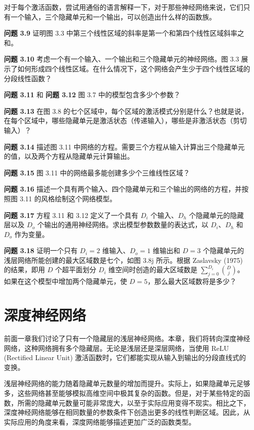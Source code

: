 \documentclass[lang=cn,newtx,10pt,scheme=chinese]{elegantbook}
\begin{document}
对于每个激活函数，尝试用通俗的语言解释一下，对于那些神经网络来说，它们只有一个输入，三个隐藏单元和一个输出，可以创造出什么样的函数族。


\textbf{问题 3.9} 证明图 3.3 中第三个线性区域的斜率是第一个和第四个线性区域斜率之和。

\textbf{问题 3.10} 考虑一个有一个输入、一个输出和三个隐藏单元的神经网络。图 3.3 展示了如何形成四个线性区域。在什么情况下，这个网络会产生少于四个线性区域的分段线性函数？

\textbf{问题 3.11} 和 \textbf{问题 3.12} 图 3.7 中的模型包含多少个参数？

\textbf{问题 3.13} 在图 3.8 的七个区域中，每个区域的激活模式分别是什么？也就是说，在每个区域中，哪些隐藏单元是激活状态（传递输入），哪些是非激活状态（剪切输入）？

\textbf{问题 3.14} 描述图 3.11 中网络的方程。需要三个方程从输入计算出三个隐藏单元的值，以及两个方程从隐藏单元计算输出。

\textbf{问题 3.15} 图 3.11 中的网络最多能创建多少个三维线性区域？

\textbf{问题 3.16} 描述一个具有两个输入、四个隐藏单元和三个输出的网络的方程，并按照图 3.11 的风格绘制这个网络模型。

\textbf{问题 3.17} 方程 3.11 和 3.12 定义了一个具有 \(D_i\) 个输入、\(D_h\) 个隐藏单元的隐藏层以及 \(D_o\) 个输出的通用神经网络。求出模型参数数量的表达式，以 \(D_i\)、\(D_h\) 和 \(D_o\) 作为变量。

\textbf{问题 3.18} 证明一个只有 \(D_i = 2\) 维输入、\(D_o = 1\) 维输出和 \(D = 3\) 个隐藏单元的浅层网络所能创建的最大区域数是七个，如图 3.8j 所示。根据 Zaslavsky (1975) 的结果，即用 \(D\) 个超平面划分 \(D_i\) 维空间时创造的最大区域数是 \(\sum_{j=0}^{D_i} \binom{D}{j}\)。如果在这个模型中增加两个隐藏单元，使 \(D = 5\)，那么最大区域数将是多少？

\chapter{深度神经网络}

前面一章我们讨论了只有一个隐藏层的浅层神经网络。本章，我们将转向深度神经网络，这种网络拥有多个隐藏层。无论是浅层还是深层网络，当使用 ReLU (Rectified Linear Unit) 激活函数时，它们都能实现从输入到输出的分段直线式的变换。

浅层神经网络的能力随着隐藏单元数量的增加而提升。实际上，如果隐藏单元足够多，这些网络甚至能够模拟高维空间中极其复杂的函数。但是，对于某些特定的函数，所需的隐藏单元数量可能非常庞大，以至于实际应用变得不现实。相比之下，深度神经网络能够在相同数量的参数条件下创造出更多的线性判断区域。因此，从实际应用的角度来看，深度网络能够描述更加广泛的函数类型。
\end{document}
